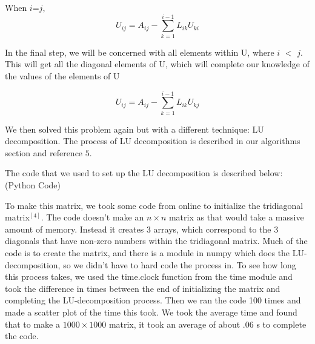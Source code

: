 \documentclass{article}
\begin{document}
When $i$=$j$,
\begin{equation*}
U_{ij}=A_{ij} -\sum_{k=1}^{i-1} L_{ik} U_{ki}
\end{equation*}

In the final step, we will be concerned with all elements within U, where $i$ $<$ $j$. This will get all the diagonal elements of U, which will complete our knowledge of the values of the elements of U

\begin{equation*}
U_{ij} = A_{ij}- \sum_{k=1}^{i-1} L_{ik} U_{kj}
\end{equation*}

We then solved this problem again but with a different technique: LU decomposition. The process of LU decomposition is described in our algorithms section and reference ${5}$. 

The code that we used to set up the LU decomposition is described below: (Python Code)



To make this matrix, we took some code from online to initialize the tridiagonal matrix$^{[4]}$. The code doesn't make an $n\times n$ matrix as that would take a massive amount of memory. Instead it creates 3 arrays, which correspond to the 3 diagonals that have non-zero numbers within the tridiagonal matrix. Much of the code is to create the matrix, and there is a module in numpy which does the LU-decomposition, so we didn't have to hard code the process in. To see how long this process takes, we used the time.clock function from the time module and took the difference in times between the end of initializing the matrix and completing the LU-decomposition process. Then we ran the code 100 times and made a scatter plot of the time this took. We took the average time and found that to make a $1000\times1000$ matrix, it took an average of about .06 s to complete the code.
\end{document}
